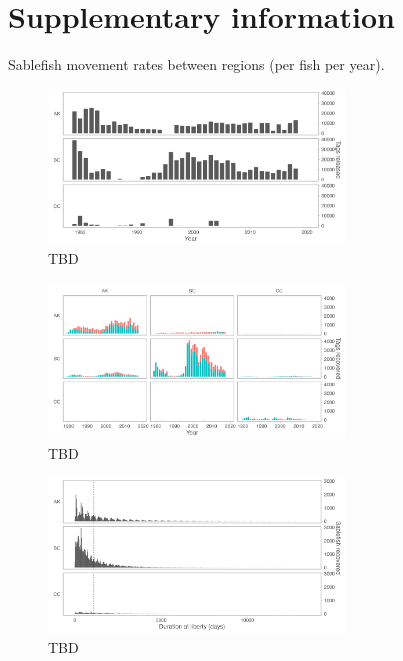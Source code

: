 \documentclass{article}
\begin{document}
\section{Supplementary information}

\begin{table}[h]
  \begin{center}
  \caption{Sablefish movement rates between regions (per fish per year).}
  \label{tab:movement-rate-regions-3-mean}
  \end{center}
\end{table}

\begin{figure}[htb]
    \centering
    \includegraphics[width = 0.7\textwidth]{bar-regions-3-released-by-year}
    \caption{TBD}
    \label{fig:bar-regions-3-released-by-year}
\end{figure}

\begin{figure}[htb]
    \centering
    \includegraphics[width = 0.7\textwidth]{bar-regions-3-recovered-by-year}
    \caption{TBD}
    \label{fig:bar-regions-3-recovered-by-year}
\end{figure}

\begin{figure}[htb]
    \centering
    \includegraphics[width = 0.7\textwidth]{bar-regions-3-duration-at-liberty}
    \caption{TBD}
    \label{fig:bar-regions-3-duration-at-liberty}
\end{figure}
\end{document}
